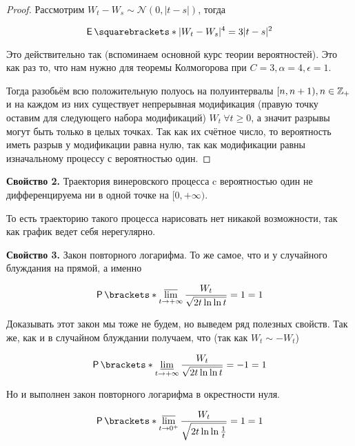 \begin{proof}
  Рассмотрим $W_t - W_s \sim \mathcal{N}(0, |t - s|)$, тогда

  \[
    \E{|W_t - W_s|^4} = 3|t - s|^2
  \]

  Это действительно так (вспоминаем основной курс теории вероятностей). Это как
  раз то, что нам нужно для теоремы Колмогорова при $C = 3, \alpha = 4, \epsilon = 1$.

  Тогда разобьём всю положительную полуось на полуинтервалы $[n, n + 1), n \in \mathbb{Z}_+$ 
  и на каждом  из них существует непрерывная модификация (правую точку оставим для
  следующего набора модификаций) $W_t \ \forall t \geq 0$,
  а значит разрывы могут
  быть только в целых точках. Так как их счётное число, то вероятность иметь разрыв
  у модификации равна нулю, так как модификации равны изначальному процессу с вероятностью
  один.
\end{proof}


\textbf{Свойство 2.} Траектория винеровского процесса c вероятностью один не 
дифференцируема
ни в одной точке на $[0, +\infty)$.

То есть траекторию такого процесса нарисовать нет никакой возможности, так как
график ведет себя нерегулярно.

\textbf{Свойство 3.} Закон повторного логарифма. То же самое, что и у случайного
блуждания на прямой, а именно

\[
  \Pr{\varlimsup\limits_{t \to +\infty} \frac{W_t}{\sqrt{2t\ln\ln t}} = 1} = 1
\]

Доказывать этот закон мы тоже не будем, но выведем ряд полезных
свойств. Так же, как и в случайном блуждании получаем, что (так как $W_t \sim -W_t$)

\[
  \Pr{\varliminf\limits_{t \to +\infty} \frac{W_t}{\sqrt{2t\ln\ln t}} = -1} = 1
\]

Но и выполнен закон повторного логарифма в окрестности нуля.

\begin{lemma}
  \[
    \Pr{\varlimsup\limits_{t \to 0^+} \frac{W_t}{\sqrt{2t\ln\ln \frac1t}} = 1} = 1
  \]
\end{lemma}
  
